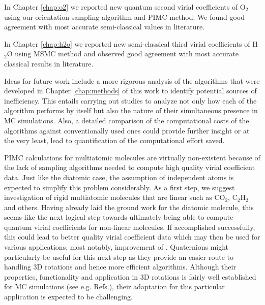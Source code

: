     In Chapter \ref{chap:o2} we reported new quantum second virial coefficients of O$_2$ using our orientation sampling algorithm and PIMC method. We found good agreement with most accurate semi-classical values in literature.

    In Chapter \ref{chap:h2o} we reported new semi-classical third virial coefficients of H$_2$O using MSMC method and observed good agreement with most accurate classical results in literature.

    Ideas for future work include a more rigorous analysis of the algorithms that were developed in Chapter \ref{chap:methods} of this work to identify potential sources of inefficiency. This entails carrying out studies to analyze not only how each of the algorithm performs by itself but also the nature of their simultaneous presence in MC simulations. Also, a detailed comparison of the computational costs of the algorithms against conventionally used ones could provide further insight or at the very least, lead to quantification of the computational effort saved.

    PIMC calculations for multiatomic molecules are virtually non-existent because of the lack of sampling algorithms needed to compute high quality virial coefficient data. Just like the diatomic case, the assumption of independent atoms is expected to simplify this problem considerably. As a first step, we suggest investigation of rigid multiatomic molecules that are linear such as CO$_2$, C$_2$H$_2$ and others. Having already laid the ground work for the diatomic molecule, this seems like the next logical step towards ultimately being able to compute quantum virial coefficients for non-linear molecules. If accomplished successfully, this could lead to better quality virial coefficient data which may then be used for various applications, most notably, improvement of \abinitio{} \PESs{}. Quaternions might particularly be useful for this next step as they provide an easier route to handling 3D rotations and hence more efficient algorithms. Although their properties, functionality and application in 3D rotations is fairly well established for MC simulations (see e.g. Refs.\cite{Karney2007,Sinkovits2012}), their adaptation for this particular application is expected to be challenging.
